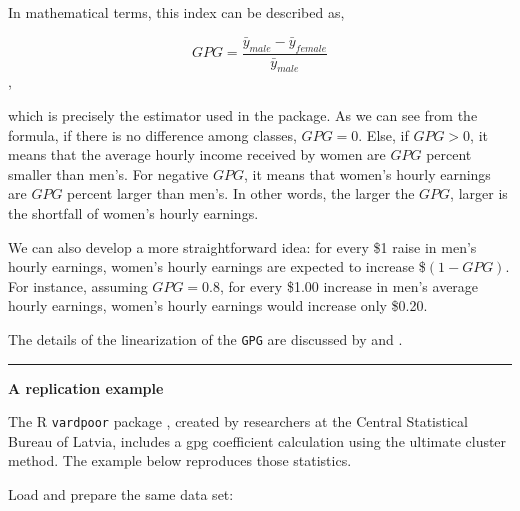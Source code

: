 \documentclass[]{book}
\begin{document}
In mathematical terms, this index can be described as,

\[ GPG = \frac{ \bar{y}_{male} - \bar{y}_{female} }{ \bar{y}_{male} } \],

which is precisely the estimator used in the package. As we can see from the formula, if there is no difference among classes, \(GPG = 0\). Else, if \(GPG > 0\), it means that the average hourly income received by women are \(GPG\) percent smaller than men's. For negative \(GPG\), it means that women's hourly earnings are \(GPG\) percent larger than men's. In other words, the larger the \(GPG\), larger is the shortfall of women's hourly earnings.

We can also develop a more straightforward idea: for every \$1 raise in men's hourly earnings, women's hourly earnings are expected to increase \$\((1-GPG)\). For instance, assuming \(GPG = 0.8\), for every \$1.00 increase in men's average hourly earnings, women's hourly earnings would increase only \$0.20.

The details of the linearization of the \texttt{GPG} are discussed by \citet{deville1999} and \citet{osier2009}.

\begin{center}\rule{0.5\linewidth}{0.5pt}\end{center}

\textbf{A replication example}

The R \texttt{vardpoor} package \citep{vardpoor}, created by researchers at the Central Statistical Bureau of Latvia, includes a gpg coefficient calculation using the ultimate cluster method. The example below reproduces those statistics.

Load and prepare the same data set:
\end{document}

